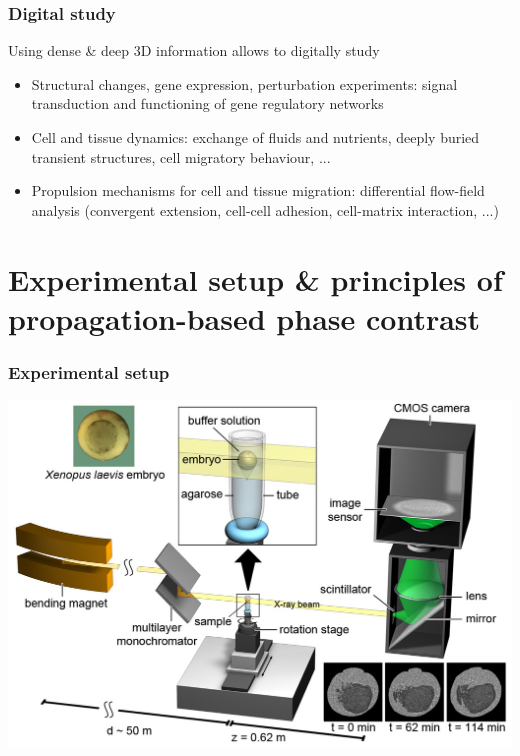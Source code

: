 \documentclass{beamer}
\begin{document}
\begin{frame}
  \frametitle{Digital study}
  Using dense \& deep 3D information allows to digitally study
  \begin{itemize}
  \item Structural changes, gene expression, perturbation experiments:
    signal transduction and functioning of gene regulatory networks
  \item Cell and tissue dynamics: exchange of fluids and nutrients,
    deeply buried transient structures, cell migratory behaviour, ...
  \item Propulsion mechanisms for cell and tissue migration:
    differential flow-field analysis (convergent extension, cell-cell
    adhesion, cell-matrix interaction, ...)
  \end{itemize}
\end{frame}

\section{Experimental setup \& principles of 
propagation-based phase contrast}
\label{sec:setup-and-principles}

\begin{frame}
  \frametitle{Experimental setup}
      \includegraphics[width=1\textwidth]{figures/setup/setup.jpg}
\end{frame}
\end{document}
